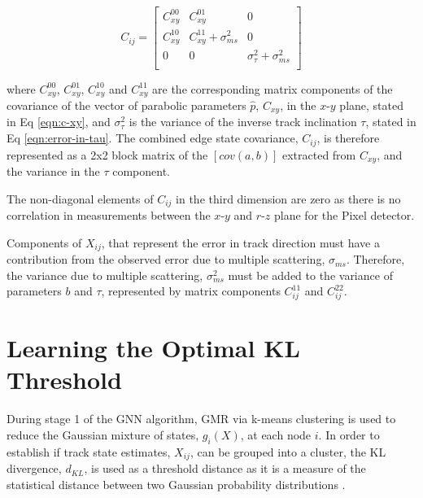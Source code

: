 \begin{equation}
    C_{ij} = \begin{bmatrix} 
            C_{xy}^{00} & C_{xy}^{01} & 0 \\ 
            C_{xy}^{10} & C_{xy}^{11} + \sigma_{ms}^2 & 0 \\ 
            0 & 0 & \sigma_{\tau}^{2} + \sigma_{ms}^2 \\
            \end{bmatrix} 
    \label{eqn:combined-edge-state-covariance}
\end{equation}

where $C_{xy}^{00}$, $C_{xy}^{01}$, $C_{xy}^{10}$ and $C_{xy}^{11}$ are the corresponding matrix components of the covariance of the vector of parabolic parameters $\hat{p}$, $C_{xy}$, in the $x$-$y$ plane, stated in Eq \eqref{eqn:c-xy}, and $\sigma_{\tau}^2$ is the variance of the inverse track inclination $\tau$, stated in Eq \eqref{eqn:error-in-tau}. The combined edge state covariance, $C_{ij}$, is therefore represented as a 2x2 block matrix of the $[cov(a, b)]$ extracted from $C_{xy}$, and the variance in the $\tau$ component.

The non-diagonal elements of $C_{ij}$ in the third dimension are zero as there is no correlation in measurements between the $x$-$y$ and $r$-$z$ plane for the Pixel detector.

Components of $X_{ij}$, that represent the error in track direction must have a contribution from the observed error due to multiple scattering, $\sigma_{ms}$. Therefore, the variance due to multiple scattering, $\sigma_{ms}^2$ must be added to the variance of parameters $b$ and $\tau$, represented by matrix components $C_{ij}^{11}$ and $C_{ij}^{22}$.




\section{Learning the Optimal KL Threshold}
\label{chapter-6-kl-threshold}

During stage 1 of the GNN algorithm, GMR via k-means clustering is used to reduce the Gaussian mixture of states, $g_i(X)$, at each node $i$. In order to establish if track state estimates, $X_{ij}$, can be grouped into a cluster, the KL divergence, $d_{KL}$, is used as a threshold distance as it is a measure of the statistical distance between two Gaussian probability distributions \cite{KL, FRUHWIRTH19971}.

